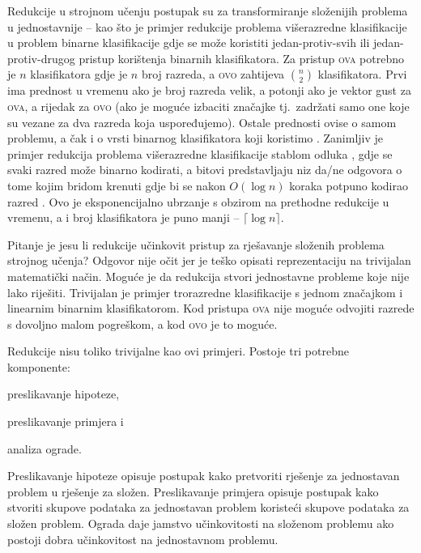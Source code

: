Redukcije u strojnom učenju postupak su za transformiranje složenijih problema
u jednostavnije -- kao što je primjer redukcije problema višerazredne
klasifikacije u problem binarne klasifikacije gdje se može koristiti
jedan-protiv-svih  ili jedan-protiv-drugog
 pristup korištenja binarnih klasifikatora. Za
pristup \textsc{ova} potrebno je $n$ klasifikatora gdje je $n$ broj razreda, a
\textsc{ovo} zahtijeva $\binom{n}{2}$ klasifikatora. Prvi ima prednost u
vremenu ako je broj razreda velik, a potonji ako je vektor gust za \textsc{ova},
a rijedak za \textsc{ovo} (ako je moguće izbaciti značajke tj.~zadržati samo one
koje su vezane za dva razreda koja uspoređujemo). Ostale prednosti ovise o samom
problemu, a čak i o vrsti binarnog klasifikatora koji koristimo
\citep{milgram2006one}. Zanimljiv je primjer redukcija problema višerazredne
klasifikacije stablom odluka , gdje se svaki razred može
binarno kodirati, a bitovi predstavljaju niz da/ne odgovora o tome kojim bridom
krenuti gdje bi se nakon $O(\log n)$ koraka potpuno kodirao razred
\citep{beygelzimer2009error, daume2016one}. Ovo je eksponencijalno ubrzanje s
obzirom na prethodne redukcije u vremenu, a i broj klasifikatora je puno manji -- $\lceil \log n \rceil$.

Pitanje je jesu li redukcije učinkovit pristup za rješavanje složenih problema
strojnog učenja? Odgovor nije očit jer je teško opisati reprezentaciju na
trivijalan matematički način. Moguće je da redukcija stvori jednostavne probleme
koje nije lako riješiti. Trivijalan je primjer trorazredne klasifikacije s
jednom značajkom i linearnim binarnim klasifikatorom. Kod pristupa \textsc{ova}
nije moguće odvojiti razrede s dovoljno malom pogreškom, a kod \textsc{ovo} je
to moguće.

Redukcije nisu toliko trivijalne kao ovi primjeri. Postoje tri potrebne
komponente:
\begin{inlinelist}
  \item preslikavanje hipoteze,
  \item preslikavanje primjera i
  \item analiza ograde.
\end{inlinelist}
Preslikavanje hipoteze opisuje postupak kako pretvoriti rješenje za jednostavan
problem u rješenje za složen. Preslikavanje primjera opisuje postupak kako
stvoriti skupove podataka za jednostavan problem koristeći skupove podataka za
složen problem. Ograda daje jamstvo učinkovitosti na složenom problemu ako postoji
dobra učinkovitost na jednostavnom problemu.

